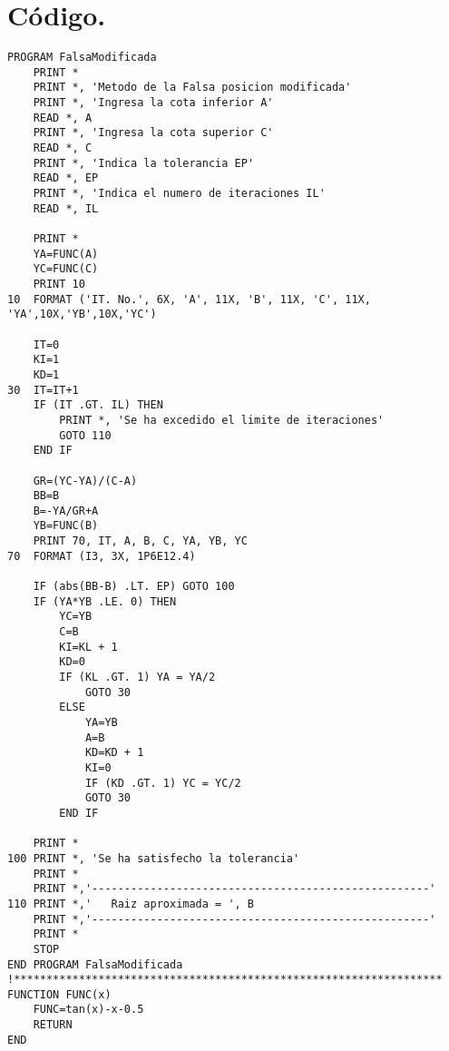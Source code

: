 \documentclass[12pt]{article}
\begin{document}
\section{Código.}
\begin{lstlisting}
PROGRAM FalsaModificada
	PRINT *
	PRINT *, 'Metodo de la Falsa posicion modificada'
	PRINT *, 'Ingresa la cota inferior A'
	READ *, A
	PRINT *, 'Ingresa la cota superior C'
	READ *, C
	PRINT *, 'Indica la tolerancia EP'
	READ *, EP
	PRINT *, 'Indica el numero de iteraciones IL'
	READ *, IL

	PRINT *
	YA=FUNC(A)
	YC=FUNC(C)
	PRINT 10
10	FORMAT ('IT. No.', 6X, 'A', 11X, 'B', 11X, 'C', 11X,  'YA',10X,'YB',10X,'YC')

	IT=0
	KI=1
	KD=1
30	IT=IT+1
	IF (IT .GT. IL) THEN
		PRINT *, 'Se ha excedido el limite de iteraciones'
		GOTO 110
	END IF

	GR=(YC-YA)/(C-A)
	BB=B
	B=-YA/GR+A
	YB=FUNC(B)
	PRINT 70, IT, A, B, C, YA, YB, YC
70	FORMAT (I3, 3X, 1P6E12.4)

	IF (abs(BB-B) .LT. EP) GOTO 100
	IF (YA*YB .LE. 0) THEN
		YC=YB
		C=B
		KI=KL + 1
		KD=0
		IF (KL .GT. 1) YA = YA/2
			GOTO 30
		ELSE
			YA=YB
			A=B
			KD=KD + 1
			KI=0
			IF (KD .GT. 1) YC = YC/2
			GOTO 30
		END IF

	PRINT *
100	PRINT *, 'Se ha satisfecho la tolerancia'
	PRINT *
	PRINT *,'----------------------------------------------------'
110	PRINT *,'	Raiz aproximada = ', B
	PRINT *,'----------------------------------------------------'
	PRINT *
	STOP
END PROGRAM FalsaModificada
!******************************************************************
FUNCTION FUNC(x)
	FUNC=tan(x)-x-0.5
	RETURN
END
\end{lstlisting}
\end{document}
